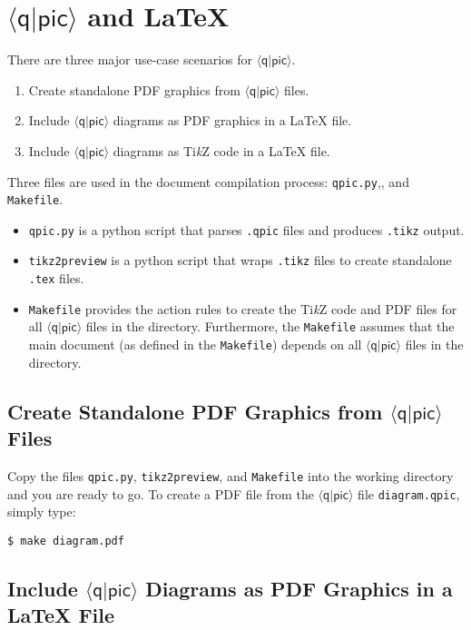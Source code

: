 \documentclass[twoside,12pt]{article}
\newcommand{\qpic}{$\langle\mathsf{q}|\mathsf{pic}\rangle$\xspace}
\newcommand{\TikZ}{Ti\emph{k}Z\xspace}
\begin{document}
\section{\qpic and \LaTeX}
\label{sec-tools}

There are three major use-case scenarios for \qpic.
\begin{enumerate}
\item Create standalone PDF graphics from \qpic files.
\item Include \qpic diagrams as PDF graphics in a {\LaTeX} file.
\item Include \qpic diagrams as \TikZ code in a {\LaTeX} file.
\end{enumerate}

\noindent
Three files are used in the document compilation process: {\tt qpic.py},, and {\tt Makefile}.

\begin{itemize}
\item {\tt qpic.py} is a python script that parses {\tt .qpic} files and produces {\tt .tikz} output.
\item {\tt tikz2preview} is a python script that wraps {\tt .tikz} files to create stand\-alone {\tt .tex} files.
\item {\tt Makefile} provides the action rules to create the \TikZ code and PDF files for all \qpic files in the directory. Furthermore, the {\tt Makefile} assumes that the main document (as defined in the {\tt Makefile}) depends on all \qpic files in the directory.
\end{itemize}

\subsection{Create Standalone PDF Graphics from \qpic Files}

Copy the files {\tt qpic.py}, {\tt tikz2preview}, and {\tt Makefile} into the working directory and you are ready to go. To create a PDF file from the \qpic file {\tt diagram.qpic}, simply type:

\begin{minipage}{5in}
\begin{lstlisting}[basicstyle=\normalsize\ttfamily,numbers=none]
$ make diagram.pdf
\end{lstlisting}
\end{minipage}%


\subsection{Include \qpic Diagrams as PDF Graphics in a {\LaTeX} File}
\end{document}
